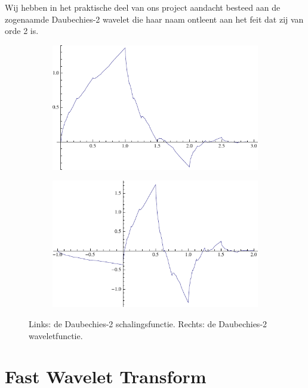 Wij hebben in het praktische deel van ons project aandacht besteed aan de zogenaamde Daubechies-2 wavelet die haar naam ontleent aan het feit dat zij van orde 2 is.

\begin{figure}[h]
  \centering
  \begin{subfigure}{0.48\linewidth}
    \includegraphics[width=\linewidth]{plaatjes/db2_phi.pdf}
  \end{subfigure}
  \begin{subfigure}{0.48\linewidth}
    \includegraphics[width=\linewidth]{plaatjes/db2_psi.pdf}
  \end{subfigure}
  \caption{Links: de Daubechies-2 schalingsfunctie. Rechts: de Daubechies-2 waveletfunctie.}
\end{figure}

\section{Fast Wavelet Transform}

